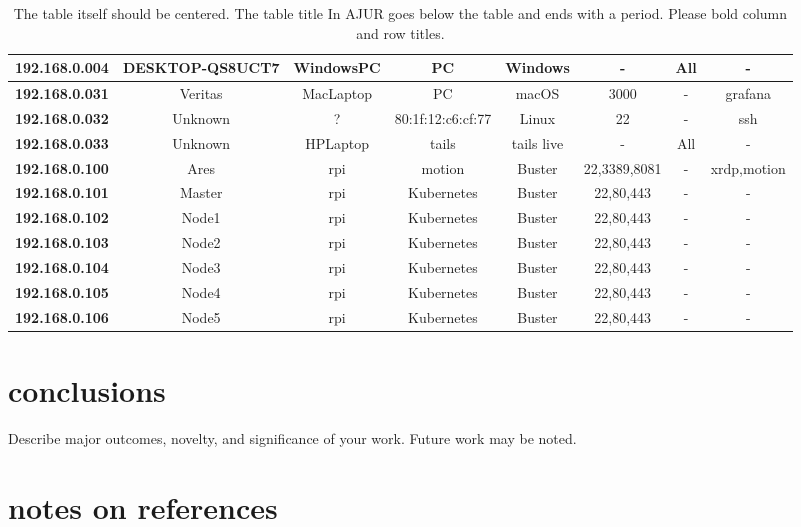 \documentclass[10pt]{article}
\begin{document}
\begin{table}[H]
\begin{center}
\begin{tabular}{ | c | c | c | c | c | c | c | c | }
   \hline
   \textbf{192.168.0.004}  & DESKTOP-QS8UCT7 & WindowsPC & PC & Windows & - & All & - \\  
   \hline
   \textbf{192.168.0.031} & Veritas & MacLaptop & PC & macOS & 3000 & - & grafana \\
   \hline
   \textbf{192.168.0.032} & Unknown & ? & 80:1f:12:c6:cf:77 & Linux & 22 & - & ssh \\
   \hline
   \textbf{192.168.0.033} & Unknown & HPLaptop & tails & tails live & - & All & - \\  
   \hline
   \textbf{192.168.0.100}  & Ares & rpi & motion & Buster & 22,3389,8081 & - & xrdp,motion \\  
   \hline
   \textbf{192.168.0.101}  & Master & rpi & Kubernetes & Buster & 22,80,443 & - & - \\  
   \hline
   \textbf{192.168.0.102}  & Node1 & rpi & Kubernetes & Buster & 22,80,443 & - & - \\  
   \hline
   \textbf{192.168.0.103}  & Node2 & rpi & Kubernetes & Buster & 22,80,443 & - & - \\  
   \hline
   \textbf{192.168.0.104}  & Node3 & rpi & Kubernetes & Buster & 22,80,443 & - & - \\  
   \hline
   \textbf{192.168.0.105}  & Node4 & rpi & Kubernetes & Buster & 22,80,443 & - & - \\  
   \hline
   \textbf{192.168.0.106}  & Node5 & rpi & Kubernetes & Buster & 22,80,443 & - & - \\  
   \hline
  \end{tabular}
  \caption{The table itself should be centered.  The table title In AJUR goes below the table and ends with a period. Please bold column and row titles.}
  \label{local table}
  \end{center}
  \end{table}


\section*{conclusions}
Describe major outcomes, novelty, and significance of your work. Future work may be noted.

\section*{notes on references}
\end{document}

